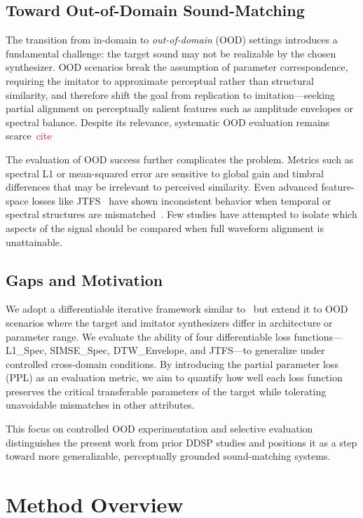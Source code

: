 \documentclass[14pt]{extarticle} %
\newcommand{\todo}[1]{\textcolor{red}{#1}}
\begin{document}
\subsection{Toward Out-of-Domain Sound-Matching}
The transition from in-domain to \emph{out-of-domain} (OOD) settings introduces a fundamental challenge: the target sound may not be realizable by the chosen synthesizer. OOD scenarios break the assumption of parameter correspondence, requiring the imitator to approximate perceptual rather than structural similarity, and therefore shift the goal from replication to imitation—seeking partial alignment on perceptually salient features such as amplitude envelopes or spectral balance.  
Despite its relevance, systematic OOD evaluation remains scarce~\todo{cite}

The evaluation of OOD success further complicates the problem.  
Metrics such as spectral L1 or mean-squared error are sensitive to global gain and timbral differences that may be irrelevant to perceived similarity.  
Even advanced feature-space losses like JTFS~\cite{vahidi2023mesostructures} have shown inconsistent behavior when temporal or spectral structures are mismatched~\cite{salimi2025soundmatching}.  
Few studies have attempted to isolate which aspects of the signal should be compared when full waveform alignment is unattainable.

\subsection{Gaps and Motivation}
We adopt a differentiable iterative framework similar to~\cite{salimi2025evaluating} but extend it to OOD scenarios where the target and imitator synthesizers differ in architecture or parameter range.  
We evaluate the ability of four differentiable loss functions—L1\_Spec, SIMSE\_Spec, DTW\_Envelope, and JTFS—to generalize under controlled cross-domain conditions.  
By introducing the partial parameter loss (PPL) as an evaluation metric, we aim to quantify how well each loss function preserves the critical transferable parameters of the target while tolerating unavoidable mismatches in other attributes.

This focus on controlled OOD experimentation and selective evaluation distinguishes the present work from prior DDSP studies and positions it as a step toward more generalizable, perceptually grounded sound-matching systems.


\section{Method Overview}
\label{sec:method_overview}
\end{document}
